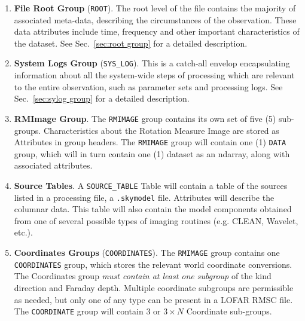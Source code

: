 \documentclass[a4paper,10pt,bibtotoc]{scrartcl}
\begin{document}
\begin{enumerate} \parskip 0pt
\item \textbf{File Root Group} (\verb|ROOT|). The root level of the file contains
  the majority of associated meta-data, describing the circumstances
  of the observation. These data attributes include time, frequency
  and other important characteristics of the dataset. See
  Sec.~\ref{sec:root group} for a detailed description.
  
\item \textbf{System Logs Group} (\verb|SYS_LOG|). This is a catch-all
  envelop encapsulating information about all the system-wide steps of
  processing which are relevant to the entire observation, such as
  parameter sets and processing logs. See Sec.~\ref{sec:sylog group}
  for a detailed description.
  
\item \textbf{RMImage Group}. The \texttt{RMIMAGE} group contains its own set of five (5) sub-groups.  Characteristics about the Rotation Measure Image are stored as Attributes in group headers.  The \texttt{RMIMAGE} group will contain one (1) \texttt{DATA} group, which will in turn contain one (1) dataset as an ndarray, along with associated attributes.


\item \textbf{Source Tables}.  A \verb|SOURCE_TABLE| Table  will contain a table of the sources listed in a processing file, a \verb|.skymodel| file.  Attributes will describe the columnar data.  This table will also contain the model components obtained from one of several possible types of imaging routines (e.g. CLEAN, Wavelet, etc.).

\item \textbf{Coordinates Groups} (\verb|COORDINATES|). The \texttt{RMIMAGE} group contains one \texttt{COORDINATES} group, which stores the relevant world coordinate conversions. The Coordinates group \textit{must contain at least one subgroup} of the kind direction and Faraday depth.  Multiple coordinate subgroups are permissible as needed, but only one of any type can be present in a LOFAR RMSC file. The \texttt{COORDINATE} group will contain 3 or $3 \times N$ Coordinate sub-groups. 
  

\end{enumerate}
\end{document}
